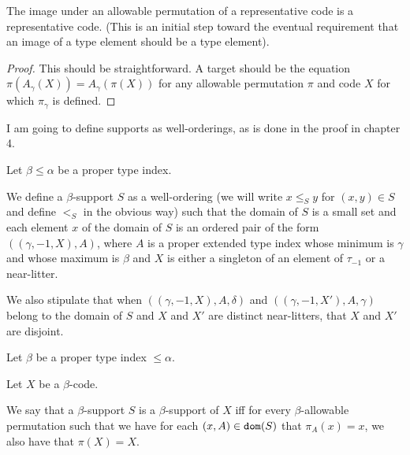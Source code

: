 \begin{lemma}
\label {lem:rep-preserved}

The image under an allowable permutation of a representative code is a representative code.  (This is an initial step toward the eventual requirement that an image of a type element should be a type element).

\end{lemma}

\begin{proof}

This should be straightforward.  A target should be the equation $\pi(A_\gamma(X)) = A_\gamma(\pi(X))$ for any allowable permutation $\pi$ and code $X$ for which $\pi_\gamma$ is defined.

\end{proof}

I am going to define supports as well-orderings, as is done in the proof in chapter 4.

\begin{definition}
\label {def:support}

Let $\beta \leq \alpha$ be a proper type index.

We define a $\beta$-support $S$ as a well-ordering (we will write $x \leq_S y$ for $(x,y) \in S$ and define $<_S$ in the obvious way) such that the domain of $S$ is a small set and each element $x$ of the domain of $S$ is an ordered pair of the form
$((\gamma,-1,X),A)$, where $A$ is a proper extended type index whose minimum is $\gamma$ and whose maximum is $\beta$
and $X$ is either a singleton of an element of $\tau_{-1}$ or a near-litter.

We also stipulate that when $((\gamma,-1,X),A,\delta)$ and $((\gamma,-1,X'),A,\gamma)$ belong to the domain of $S$
and $X$ and $X'$ are distinct near-litters, that $X$ and $X'$ are disjoint.

\end{definition}

\begin{definition}
\label {def:support-of}

Let $\beta$ be a proper type index $\leq \alpha$.

Let $X$ be a $\beta$-code.

We say that a $\beta$-support $S$ is a $\beta$-support of $X$ iff for every $\beta$-allowable permutation such that
we have for each $(x,A) \in {\tt dom}(S)$ that $\pi_A(x)=x$, we also have that $\pi(X)=X$.

\end{definition}

